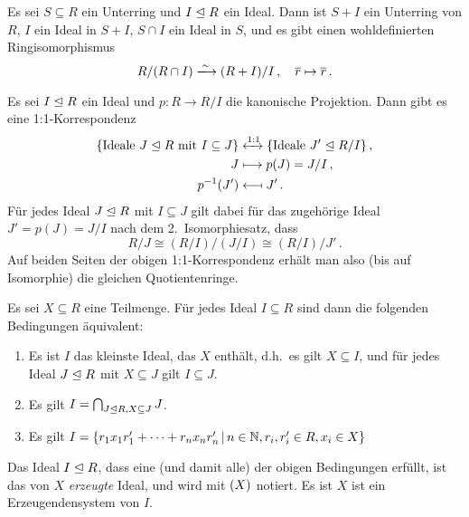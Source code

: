 \begin{corollary}[3.\ Isomorphiesatz]
  Es sei $S \subseteq R$ ein Unterring und $I \mathrel{\trianglelefteq} R$ ein Ideal.
  Dann ist $S + I$ ein Unterring von $R$, $I$ ein Ideal in $S + I$, $S \cap I$ ein Ideal in $S$, und es gibt einen wohldefinierten Ringisomorphismus
  \[
                            R/(R \cap I)
    \xlongrightarrow{\sim}  (R + I)/I \,,
    \quad                   \class{r}
    \mapsto                 \class{r} \,.
  \]
\end{corollary}

\begin{lemma}
  \label{lemma: correspondence between ideals}
  Es sei $I \mathrel{\trianglelefteq} R$ ein Ideal und $p \colon R \to R/I$ die kanonische Projektion.
  Dann gibt es eine 1:1-Korrespondenz
  \begin{align*}
    \{ \text{Ideale $J \mathrel{\trianglelefteq} R$ mit $I \subseteq J$} \}
    &\xleftrightarrow{1:1}
    \{ \text{Ideale $J' \mathrel{\trianglelefteq} R/I$} \} \,,
    \\
    J
    &\longmapsto
    p(J)
    =
    J/I \,,
    \\
    p^{-1}(J')
    &\longmapsfrom
    J' \,.
  \end{align*}
  Für jedes Ideal $J \mathrel{\trianglelefteq} R$ mit $I \subseteq J$ gilt dabei für das zugehörige Ideal $J' = p(J) = J/I$ nach dem 2.\ Isomorphiesatz, dass
  \[
          R/J
    \cong (R/I)/(J/I)
    \cong (R/I)/J' \,.
  \]
  Auf beiden Seiten der obigen 1:1-Korrespondenz erhält man also \textup(bis auf Isomorphie\textup) die gleichen Quotientenringe.
\end{lemma}

Es sei $X \subseteq R$ eine Teilmenge.
Für jedes Ideal $I \subseteq R$ sind dann die folgenden Bedingungen äquivalent:

\begin{enumerate}
  \item
    Es ist $I$ das kleinste Ideal, das $X$ enthält, d.h.\ es gilt $X \subseteq I$, und für jedes Ideal $J \mathrel{\trianglelefteq} R$ mit $X \subseteq J$ gilt $I \subseteq J$.
  \item
    Es gilt $I = \bigcap_{J \mathrel{\trianglelefteq} R, X \subseteq J} J$.
  \item
    Es gilt
    $
        I
      = \{
          r_1 x_1 r'_1 + \dotsb + r_n x_n r'_n
        \suchthat
          n \in \Natural,
          r_i, r'_i \in R,
          x_i \in X
        \}
    $
\end{enumerate}

\begin{definition}
  Das Ideal $I \mathrel{\trianglelefteq} R$, dass eine \textup(und damit alle\textup) der obigen Bedingungen erfüllt, ist das von $X$ \emph{erzeugte} Ideal, und wird mit $(X)$ notiert.
  Es ist $X$ ist ein Erzeugendensystem von $I$.
\end{definition}

